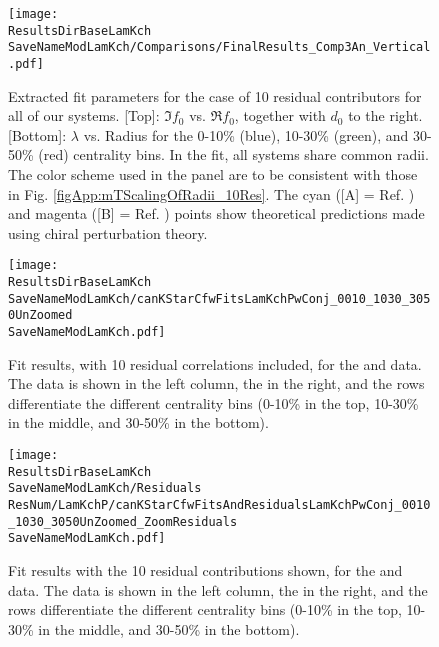 \documentclass[/home/jesse/Analysis/FemtoAnalysis/AnalysisNotes/AnalysisNoteJBuxton.tex]{subfiles}
\renewcommand{\NonFlatBgdLamKch}{_NonFlatBgdCrctnLamK0LinearLamKchPolynomial}
\renewcommand{\ResNum}{_10Res}
\renewcommand{\PrimMaxDecay}{_PrimMaxDecay4fm}
\renewcommand{\SaveNameModLamKch}{\MomRes\NonFlatBgdLamKch\ResNum\PrimMaxDecay\ResMethod\ParamFixAndShareLamKch}
\begin{document}
\begin{figure}[h]
  \centering
  \texttt{[image: \\ResultsDirBaseLamKch\\SaveNameModLamKch/Comparisons/FinalResults\_Comp3An\_Vertical.pdf]}
  \caption[Extracted scattering parameters: 10 residuals]
  {
  Extracted fit parameters for the case of 10 residual contributors for all of our \LamK systems.  
  [Top]: $\Im f_{0}$ vs. $\Re f_{0}$, together with $d_{0}$ to the right.  
  [Bottom]: $\lambda$ vs. Radius for the 0-10\% (blue), 10-30\% (green), and 30-50\% (red) centrality bins.  
  In the fit, all \LamK systems share common radii.
  The color scheme used in the panel are to be consistent with those in Fig. \ref{figApp:mTScalingOfRadii_10Res}.
  The cyan ([A] = Ref. \cite{Liu:2006xja}) and magenta ([B] = Ref. \cite{Mai:2009ce}) points show theoretical predictions made using chiral perturbation theory.  
  }
  \label{figApp:ScattParams_10Res}
\end{figure}


\begin{figure}[h]
  \centering
  \texttt{[image: \\ResultsDirBaseLamKch\\SaveNameModLamKch/canKStarCfwFitsLamKchPwConj\_0010\_1030\_3050UnZoomed\\SaveNameModLamKch.pdf]}
  \caption[\LamKchPALamKchM data with fits: 10 residuals]
  {
  Fit results, with 10 residual correlations included, for the \LamKchP and \ALamKchM data.
  The \LamKchP data is shown in the left column, the \ALamKchM in the right, and the rows differentiate the different centrality bins (0-10\% in the top, 10-30\% in the middle, and 30-50\% in the bottom).
  }
  \label{figApp:LamKchPwConjFits_10Res}
\end{figure}


\begin{figure}[h]
  \centering
  \texttt{[image: \\ResultsDirBaseLamKch\\SaveNameModLamKch/Residuals\\ResNum/LamKchP/canKStarCfwFitsAndResidualsLamKchPwConj\_0010\_1030\_3050UnZoomed\_ZoomResiduals\\SaveNameModLamKch.pdf]}
  \caption[\LamKchPALamKchM fit contribution from residuals: 10 residuals]
  {
  Fit results with the 10 residual contributions shown, for the \LamKchP and \ALamKchM data.
  The \LamKchP data is shown in the left column, the \ALamKchM in the right, and the rows differentiate the different centrality bins (0-10\% in the top, 10-30\% in the middle, and 30-50\% in the bottom).
  }
  \label{figApp:LamKchPwConjFitsAndResiduals_10Res}
\end{figure}
\end{document}
